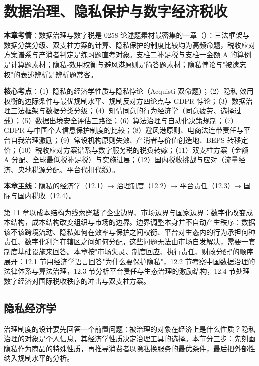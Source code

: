 \chapter{数据治理、隐私保护与数字经济税收}

\begin{examguide}
\textbf{本章考情}：数据治理与数字税是 0258 论述题素材最密集的一章（）：三法框架与数据分类分级、双支柱方案的计算、隐私保护的制度比较均为高频命题，税收应对方案谱系与产消者判定是练习题直考对象。支柱二补足税与支柱一金额 A 的算例是计算题素材；隐私-效用权衡与避风港原则是简答题素材；隐私悖论与"被遗忘权"的表述辨析是辨析题常客。

\textbf{核心考点}：（1）隐私的经济学性质与隐私悖论（Acquisti 双命题）；（2）隐私-效用权衡的边际条件与最优规制水平、规制反对方四论点与 GDPR 悖论；（3）数据治理三法框架与数据分类分级；（4）知情同意的行为经济学（同意疲劳、选择过载）；（5）数据出境安全评估三路径；（6）算法治理与自动化决策规制；（7）GDPR 与中国个人信息保护制度的比较；（8）避风港原则、电商法连带责任与平台自我治理激励；（9）常设机构原则失效、产消者与价值创造地、BEPS 转移定价；（10）税收应对方案谱系与数字服务税的税负转嫁；（11）双支柱方案（金额 A 分配、全球最低税补足税）与实施进展；（12）国内税收挑战与应对（流量经济、央地税源分配、平台代扣代缴）。

\textbf{本章主线}：隐私的经济学（12.1）→ 治理制度（12.2）→ 平台责任（12.3）→ 国际与国内税收（12.4）。
\end{examguide}

第 11 章以成本结构为线索穿越了企业边界、市场边界与国家边界：数字化改变成本结构，成本结构改变组织与市场的边界。边界调整本身并不自动产生秩序：数据该不该跨境流动、隐私如何在效率与保护之间权衡、平台对生态内的行为承担何种责任、数字化利润在辖区之间如何分配，这些问题无法由市场自发解决，需要一套制度基础设施来回答。本章按"市场失灵、制度回应、执行责任、财政分配"的顺序展开：12.1 节用经济学语言回答"为什么要保护隐私"，12.2 节考察中国数据治理的法律体系与算法治理，12.3 节分析平台责任与生态治理的激励结构，12.4 节处理数字经济对国际税收秩序的冲击与双支柱方案。

\section{隐私经济学}

治理制度的设计要先回答一个前置问题：被治理的对象在经济上是什么性质？隐私治理的对象是个人信息，其经济学性质决定治理工具的选择。本节分三步：先刻画隐私作为商品的特殊性质，再推导消费者以隐私换服务的最优条件，最后把外部性纳入规制水平的分析。

